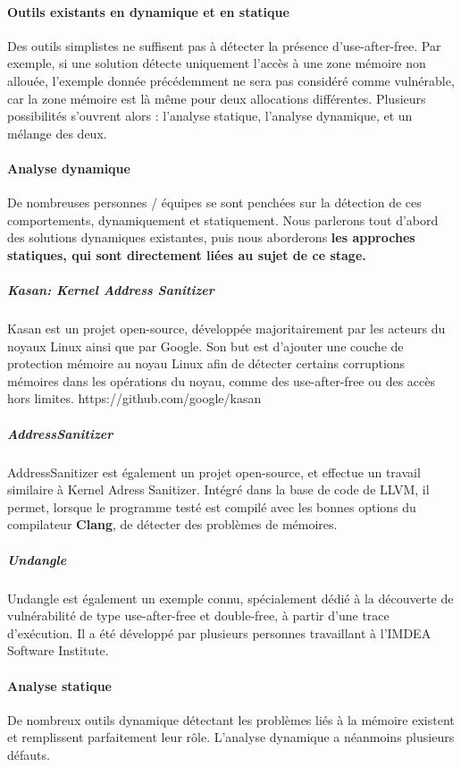 \paragraph{Outils existants en dynamique et en statique}
Des outils simplistes ne suffisent pas à détecter la présence d'use-after-free.\newline
Par exemple, si une solution détecte uniquement l'accès à une zone mémoire non allouée, l'exemple
donnée précédemment ne sera pas considéré comme vulnérable, car la zone mémoire est là même pour deux
allocations différentes. Plusieurs possibilités s'ouvrent alors : l'analyse statique, l'analyse dynamique,
et un mélange des deux.

\paragraph{Analyse dynamique}
De nombreuses personnes / équipes se sont penchées sur la détection de ces comportements, dynamiquement et
statiquement. Nous parlerons tout d'abord des solutions dynamiques existantes, puis nous aborderons \textbf{les approches
statiques, qui sont directement liées au sujet de ce stage.}

\subparagraph{Kasan: Kernel Address Sanitizer}
Kasan est un projet open-source, développée majoritairement
par les acteurs du noyaux Linux ainsi que par Google. Son but est d'ajouter une couche de protection
mémoire au noyau Linux afin de détecter certains corruptions mémoires dans les opérations du noyau, comme
des use-after-free ou des accès hors limites.
https://github.com/google/kasan

\subparagraph{AddressSanitizer}
AddressSanitizer est également un projet open-source, et effectue
un travail similaire à Kernel Adress Sanitizer. Intégré dans la base de code de
LLVM, il permet, lorsque le programme testé est compilé avec les bonnes options du compilateur \textbf{Clang},
de détecter des problèmes de mémoires.

\subparagraph{Undangle}
Undangle est également un exemple connu, spécialement dédié à la découverte de vulnérabilité
de type use-after-free et double-free, à partir d'une trace d'exécution. Il a été développé par plusieurs
personnes travaillant à l'IMDEA Software Institute.

\paragraph{Analyse statique}

De nombreux outils dynamique détectant les problèmes liés à la mémoire existent et remplissent parfaitement leur rôle.
L'analyse dynamique a néanmoins plusieurs défauts.\newline

